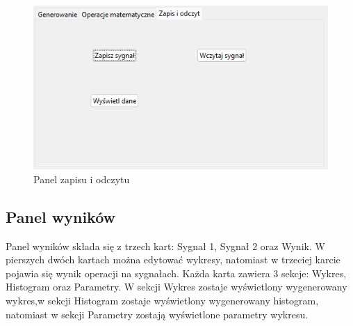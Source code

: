 \documentclass{article}
\begin{document}
\begin{figure}[h!]
    \centering
    \includegraphics[width=\textwidth]{img/zapis.png}
    \caption{Panel zapisu i odczytu}
\end{figure}

\FloatBarrier
\subsection{Panel wyników} 

Panel wyników składa się z trzech kart: Sygnał 1, Sygnał 2 oraz Wynik. W pierszych dwóch kartach można
edytować wykresy, natomiast w trzeciej karcie pojawia się wynik operacji na sygnałach.
Każda karta zawiera 3 sekcje: Wykres, Histogram oraz Parametry. W sekcji Wykres zostaje wyświetlony wygenerowany
wykres,w sekcji Histogram zostaje wyświetlony wygenerowany histogram, natomiast w sekcji Parametry 
zostają wyświetlone parametry wykresu.
\end{document}
